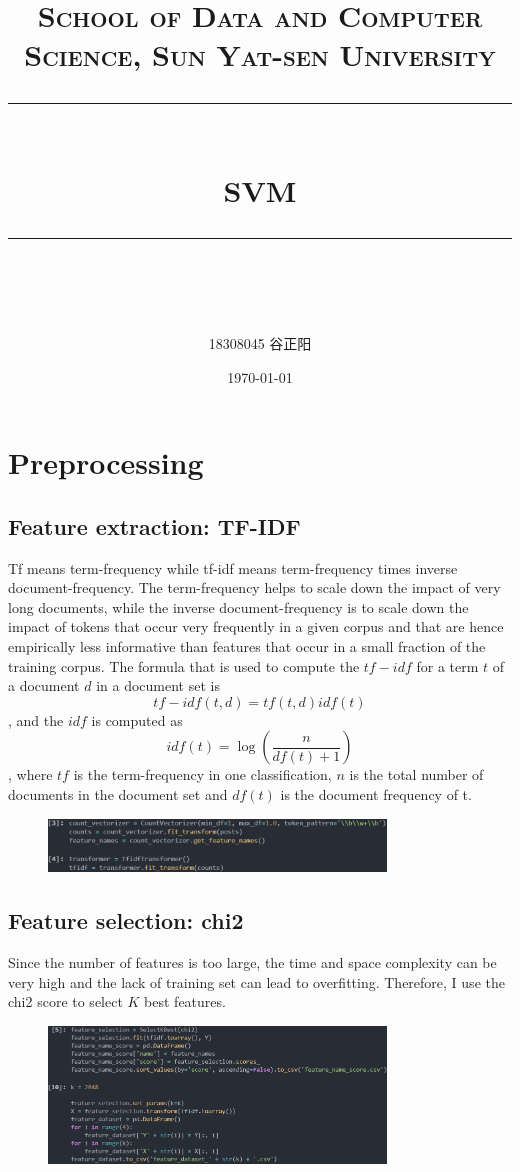 \documentclass[UTF8, a4paper, 11pt]{article}
\title{	
\normalfont \normalsize
\textsc{School of Data and Computer Science, Sun Yat-sen University} \\ [25pt] %
\rule{\textwidth}{0.5pt} \\[0.4cm] %
\huge SVM\\ %
\rule{\textwidth}{2pt} \\[0.5cm] %
\author{18308045 谷正阳}
\date{\normalsize\today}
}
\begin{document}
\maketitle
\tableofcontents
\newpage
\section{Preprocessing}
\subsection{Feature extraction: TF-IDF}
Tf means term-frequency while tf-idf means term-frequency times inverse document-frequency.
The term-frequency helps to scale down the impact of very long documents, while the inverse document-frequency is to scale down the impact of tokens that occur very frequently in a given corpus and that are hence empirically less informative than features that occur in a small fraction of the training corpus.
The formula that is used to compute the $tf-idf$ for a term $t$ of a document $d$ in a document set is
$$tf-idf(t,d)=tf(t,d)idf(t)$$
, and the $idf$ is computed as
$$idf(t)=\log(\frac n{df(t)+1})$$
, where $tf$ is the term-frequency in one classification, $n$ is the total number of documents in the document set and $df(t)$ is the document frequency of t.
\begin{figure}[H]
    \centering
    \includegraphics[width=0.8\textwidth]{tfidf.png}
\end{figure}
\subsection{Feature selection: chi2}
Since the number of features is too large, the time and space complexity can be very high and the lack of training set can lead to overfitting.
Therefore, I use the chi2 score to select $K$ best features.
\begin{figure}[H]
    \centering
    \includegraphics[width=0.8\textwidth]{chi2.png}
\end{figure}
\end{document}
